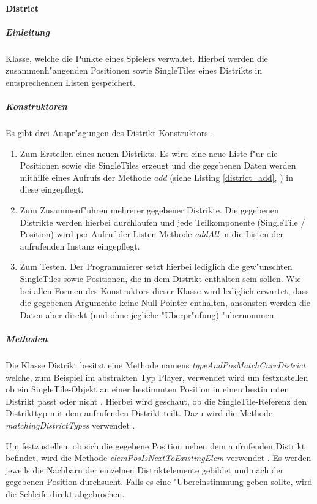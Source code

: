 \paragraph{District}
\label{par:district}
\subparagraph{Einleitung}
Klasse, welche die Punkte eines Spielers verwaltet. Hierbei werden die zusammenh"angenden Positionen sowie SingleTiles eines Distrikts in entsprechenden Listen gespeichert. 

\subparagraph{Konstruktoren} 
\label{spar:districtKonstruktoren}
Es gibt drei Auspr"agungen des Distrikt-Konstruktors . 
\begin{enumerate}
	\item Zum Erstellen eines neuen Distrikts. Es wird eine neue Liste f"ur die Positionen sowie die SingleTiles erzeugt und die gegebenen Daten werden mithilfe eines Aufrufs der Methode \emph{add} (siehe Listing \ref{district_add}, ) in diese eingepflegt. 
	\item Zum Zusammenf"uhren mehrerer gegebener Distrikte. Die gegebenen Distrikte werden hierbei durchlaufen und jede Teilkomponente (SingleTile / Position) wird per Aufruf der Listen-Methode \emph{addAll} in die Listen der aufrufenden Instanz eingepflegt. 
	\item Zum Testen. Der Programmierer setzt hierbei lediglich die gew"unschten SingleTiles sowie Positionen, die in dem Distrikt enthalten sein sollen. Wie bei allen Formen des Konstruktors dieser Klasse wird lediglich erwartet, dass die gegebenen Argumente keine Null-Pointer enthalten, ansonsten werden die Daten aber direkt (und ohne jegliche "Uberpr"ufung) "ubernommen.
\end{enumerate}

\subparagraph{Methoden}
\label{spar:districtMethoden}
Die Klasse Distrikt besitzt eine Methode namens \emph{typeAndPosMatchCurrDistrict} welche, zum Beispiel im abstrakten Typ Player, verwendet wird um festzustellen ob ein SingleTile-Objekt an einer bestimmten Position in einen bestimmten Distrikt passt oder nicht . Hierbei wird geschaut, ob die SingleTile-Referenz den Distrikttyp mit dem aufrufenden Distrikt teilt. Dazu wird die Methode \emph{matchingDistrictTypes} verwendet .

Um festzustellen, ob sich die gegebene Position neben dem aufrufenden Distrikt befindet, wird die Methode \emph{elemPosIsNextToExistingElem} verwendet . Es werden jeweils die Nachbarn der einzelnen Distriktelemente gebildet und nach der gegebenen Position durchsucht. Falls es eine "Ubereinstimmung geben sollte, wird die Schleife direkt abgebrochen. 

